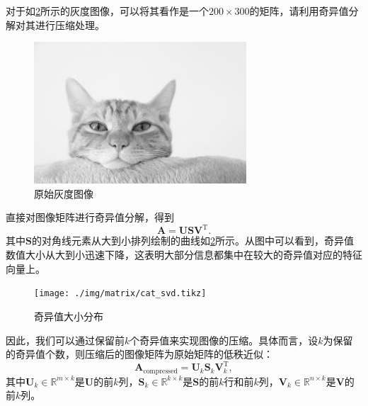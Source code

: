 \begin{example}
    对于如\cref{fig_singular_values}所示的灰度图像，可以将其看作是一个\( 200 \times 300 \)的矩阵，请利用奇异值分解对其进行压缩处理。
    \begin{figure}[htb!]
        \centering
        \includegraphics[width=.3\textwidth]{./img/matrix/cat_resized.jpg}
        \caption{原始灰度图像}
        \label{fig_cat_gray}
    \end{figure}
\end{example}
\begin{solution}
    直接对图像矩阵进行奇异值分解，得到
    \[
        \mathbf{A} = \mathbf{U} \mathbf{S} \mathbf{V}^{\mathrm{T}}.
    \]
    其中\( \mathbf{S} \)的对角线元素从大到小排列绘制的曲线如\cref{fig_singular_values}所示。从图中可以看到，奇异值数值大小从大到小迅速下降，这表明大部分信息都集中在较大的奇异值对应的特征向量上。
    \begin{figure}[htb!]
        \centering
        \texttt{[image: ./img/matrix/cat\_svd.tikz]}
        \caption{奇异值大小分布}
        \label{fig_singular_values}
    \end{figure}

    因此，我们可以通过保留前\( k \)个奇异值来实现图像的压缩。具体而言，设\( k \)为保留的奇异值个数，则压缩后的图像矩阵为原始矩阵的低秩近似：
    \[
        \mathbf{A}_{\text{compressed}} = \mathbf{U}_{k} \mathbf{S}_{k} \mathbf{V}_{k}^{\mathrm{T}},
    \]
    其中\( \mathbf{U}_k \in \mathbb{R}^{m \times k} \)是\( \mathbf{U} \)的前\( k \)列，\( \mathbf{S}_k \in \mathbb{R}^{k \times k} \)是\( \mathbf{S} \)的前\( k \)行和前\( k \)列，\( \mathbf{V}_k \in \mathbb{R}^{n \times k} \)是\( \mathbf{V} \)的前\( k \)列。


\end{solution}
